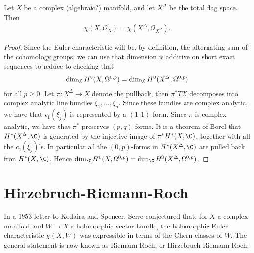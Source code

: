 \documentclass[11pt]{book}
\begin{document}
\begin{theorem}
\label{thm:chi-X-XDelta}
Let $X$ be a complex (algebraic?) manifold, and let $X^\Delta$ be the total flag space. Then
\begin{align*}
    \chi(X,\mathcal{O}_X) = \chi(X^\Delta, \mathcal{O}_{X^\Delta}).
\end{align*}
\end{theorem}
\begin{proof} Since the Euler characteristic will be, by definition, the alternating sum of the cohomology groups, we can use that dimension is additive on short exact sequences to reduce to checking that
\begin{align*}
    \dim_\C H^0(X,\Omega^{0,p}) = \dim_\C H^0(X^\Delta, \Omega^{0,p})
\end{align*}
for all $p\ge0$. Let $\pi \colon X^\Delta \to X$ denote the pullback, then $\pi^\ast TX$ decomposes into complex analytic line bundles $\xi_1, \ldots, \xi_n$. Since these bundles are complex analytic, we have that $c_1(\xi_j)$ is represented by a $(1,1)$-form. Since $\pi$ is complex analytic, we have that $\pi^\ast$ preserves $(p,q)$ forms. It is a theorem of Borel that $H^\ast(X^\Delta,\C)$ is generated by the injective image of $\pi^\ast H^\ast(X,\C)$, together with all the $c_1(\xi_j)$'s. In particular all the $(0,p)$-forms in $H^\ast(X^\Delta,\C)$ are pulled back fron $H^\ast(X,\C)$. Hence $\dim_\C H^0(X,\Omega^{0,p}) = \dim_\C H^0(X^\Delta, \Omega^{0,p})$.
\end{proof}



\section{Hirzebruch-Riemann-Roch}
In a 1953 letter to Kodaira and Spencer, Serre conjectured that, for $X$ a complex manifold and $W \to X$ a holomorphic vector bundle, the holomorphic Euler characteristic $\chi(X,W)$ was expressible in terms of the Chern classes of $W$. The general statement is now known as Riemann-Roch, or Hirzebruch-Riemann-Roch:
\end{document}
